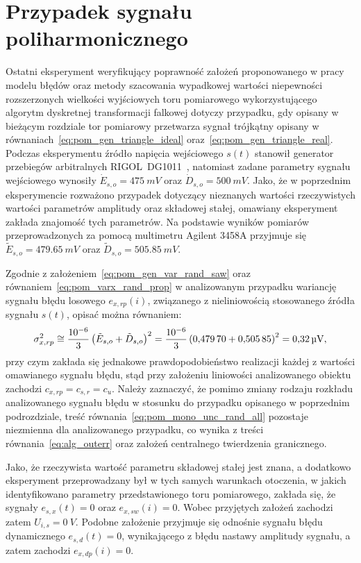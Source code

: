 \section{Przypadek sygnału poliharmonicznego}

Ostatni eksperyment weryfikujący poprawność założeń proponowanego w pracy modelu błędów oraz metody szacowania wypadkowej wartości niepewności rozszerzonych wielkości wyjściowych toru pomiarowego wykorzystującego algorytm dyskretnej transformacji falkowej dotyczy przypadku, gdy opisany w bieżącym rozdziale tor pomiarowy przetwarza sygnał trójkątny opisany w równaniach~\eqref{eq:pom_gen_triangle_ideal} oraz~\eqref{eq:pom_gen_triangle_real}. Podczas eksperymentu źródło napięcia wejściowego $s(t)$ stanowił generator przebiegów arbitralnych RIGOL~DG1011~\cite{rigol_fawg}, natomiast zadane parametry sygnału wejściowego wynosiły $\dot{E}_{s,o} = \qty{475}{mV}$ oraz $\dot{D}_{s,o} = \qty{500}{mV}$. Jako, że w poprzednim eksperymencie rozważono przypadek dotyczący nieznanych wartości rzeczywistych wartości parametrów amplitudy oraz składowej stałej, omawiany eksperyment zakłada znajomość tych parametrów. Na podstawie wyników pomiarów przeprowadzonych za pomocą multimetru Agilent 3458A przyjmuje się $\tilde{E}_{s,o} = \qty{479.65}{mV}$ oraz $\tilde{D}_{s,o} = \qty{505.85}{mV}$.

Zgodnie z założeniem~\eqref{eq:pom_gen_var_rand_saw} oraz równaniem~\eqref{eq:pom_varx_rand_prop} w analizowanym przypadku wariancję sygnału błędu losowego $e_{x,rp}(i)$, związanego z nieliniowością stosowanego źródła sygnału $s(t)$, opisać można równaniem:
\begin{equation}
\sigma_{x,rp}^{2} \cong \frac{\num{e-6}}{3} \left(\tilde{E}_{s,o} + \tilde{D}_{s,o}\right)^{2} = \frac{\num{e-6}}{3} \left(\num{0.47970} + \num{0.50585}\right)^{2} = \qty{0.32}{\micro V} \label{eq:pom_multi_rand_var_in},
\end{equation}
przy czym zakłada się jednakowe prawdopodobieństwo realizacji każdej z wartości omawianego sygnału błędu, stąd przy założeniu liniowości analizowanego obiektu zachodzi $c_{x,rp} = c_{s,r} = c_{u}$. Należy zaznaczyć, że pomimo zmiany rodzaju rozkładu analizowanego sygnału błędu w stosunku do przypadku opisanego w poprzednim podrozdziale, treść równania~\eqref{eq:pom_mono_unc_rand_all} pozostaje niezmienna dla analizowanego przypadku, co wynika z treści równania~\eqref{eq:alg_outerr} oraz założeń centralnego twierdzenia granicznego.

Jako, że rzeczywista wartość parametru składowej stałej jest znana, a dodatkowo eksperyment przeprowadzany był w tych samych warunkach otoczenia, w jakich identyfikowano parametry przedstawionego toru pomiarowego, zakłada się, że sygnały  $e_{s,x}(t) = 0$ oraz $e_{x,sw}(i) = 0$. Wobec przyjętych założeń zachodzi zatem $U_{i,s} = \qty{0}{V}$. Podobne założenie przyjmuje się odnośnie sygnału błędu dynamicznego $e_{s,d}(t) = 0$, wynikającego z błędu nastawy amplitudy sygnału, a zatem zachodzi $e_{x,dp}(i) = 0$.

